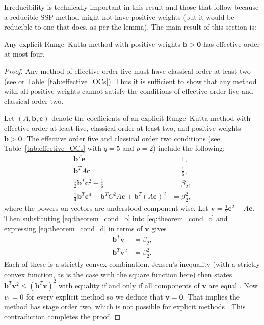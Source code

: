 \documentclass{siamltex}  %
\begin{document}
Irreducibility \cite{dahlquist2006} is technically important in this
result and those that follow because a reducible SSP method might not
have positive weights (but it would be reducible to one that does, as
per the lemma).
The main result of this section is:
\begin{theorem}\label{thm:effective_barrier}
	Any explicit Runge--Kutta method with positive weights $\bm{b} > \bm{0}$ 
	has effective order at most four.
\end{theorem}
\begin{proof}%
	Any method of effective order five must have classical order at least two
	(see \cite{Butcher2008_book} or Table~\ref{tab:effective_OCs}).
    Thus it is sufficient to show that any method with all positive weights
    cannot satisfy the conditions of effective order five and classical order two.

    Let $(A,\bm{b},\bm{c})$ denote the coefficients of an explicit Runge--Kutta method with
    effective order at least five, classical order at least two, and positive 
    weights $\bm{b} > \bm{0}$.
    The effective order five and classical order two conditions
    (see Table~\ref{tab:effective_OCs} with $q=5$ and $p=2$) include the following:
    \begin{subequations}\label{eq:theorem_cond}
    		\begin{align}
    			\bm{b}^T\bm{e} & = 1, \label{eq:theorem_cond_a} \\
             	\bm{b}^TA\bm{c} &= \frac{1}{6}, \label{eq:theorem_cond_b} \\
            	\frac{1}{2}\bm{b}^T\bm{c}^2 - \frac{1}{6} &= \beta_2, \label{eq:theorem_cond_c} \\
            	\frac{1}{4}\bm{b}^T\bm{c}^4 - \bm{b}^TC^2A\bm{c} + \bm{b}^T(A\bm{c})^2 &= \beta_2^2, \label{eq:theorem_cond_d}
        	\end{align}
	\end{subequations}
	where the powers on vectors are understood component-wise. 
	Let $\bm{v} = \frac{1}{2}\bm{c}^2 - A\bm{c}$.
	Then substituting \eqref{eq:theorem_cond_b} into \eqref{eq:theorem_cond_c} and expressing \eqref{eq:theorem_cond_d} in terms of $\bm{v}$ gives
	\begin{align*}
		\bm{b}^T\bm{v} &= \beta_2, \\%
		\bm{b}^T\bm{v}^2 &= \beta_2^2. %
	\end{align*}
  Each of these is a strictly convex combination.
  Jensen's inequality (with a strictly convex function, as is the case with the
  square function here) then states $\bm{b}^T \bm{v}^2 \leq (\bm{b}^T
  \bm{v})^2$ with equality if and only if all components of $\bm{v}$ are equal
  \cite[Theorem 12, pg 31]{Bullen:inequalities}.
  Now $v_1 = 0$ for every explicit method so we deduce that $\bm{v}=\bm{0}$.
  That implies the method has stage order two, which is not possible for
  explicit methods \cite{Ruuth2002}.
  This contradiction completes the proof.
\end{proof}
\end{document}

